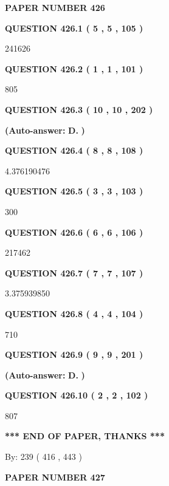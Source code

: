 \documentclass{ctexart}
\begin{document}
   
   
   
\newpage 
\setcounter{page}{ 
   426001 } 
   
   
 {\textbf{ \Large{ PAPER NUMBER  426  }}}
   
   
   
   
  
  
{\textbf{\large{QUESTION
426.1 
 ( 5 , 5 , 105 )
}}}

241626
  
  
{\textbf{\large{QUESTION
426.2 
 ( 1 , 1 , 101 )
}}}

805
  
  
{\textbf{\large{QUESTION
426.3 
 ( 10 , 10 , 202 )
}}}
 
 
{\textbf{(Auto-answer:}}
{\textbf{\large{
D.}}}
{\textbf{)}}
 
 
  
  
{\textbf{\large{QUESTION
426.4 
 ( 8 , 8 , 108 )
}}}

4.376190476
  
  
{\textbf{\large{QUESTION
426.5 
 ( 3 , 3 , 103 )
}}}

300
  
  
{\textbf{\large{QUESTION
426.6 
 ( 6 , 6 , 106 )
}}}

217462
  
  
{\textbf{\large{QUESTION
426.7 
 ( 7 , 7 , 107 )
}}}

3.375939850
  
  
{\textbf{\large{QUESTION
426.8 
 ( 4 , 4 , 104 )
}}}

710
  
  
{\textbf{\large{QUESTION
426.9 
 ( 9 , 9 , 201 )
}}}
 
 
{\textbf{(Auto-answer:}}
{\textbf{\large{
D.}}}
{\textbf{)}}
 
 
  
  
{\textbf{\large{QUESTION
426.10 
 ( 2 , 2 , 102 )
}}}

807
   
   
   
   
\vspace{1.0in} 
{\textbf{\large{ *** END OF PAPER, THANKS *** }}} 
   
   
\hspace{1.0in} By: 
 239 ( 416 ,  443 )
   
   
   
   
\newpage 
\setcounter{page}{ 
   427001 } 
   
   
 {\textbf{ \Large{ PAPER NUMBER  427  }}}
   
   
   
\end{document}
